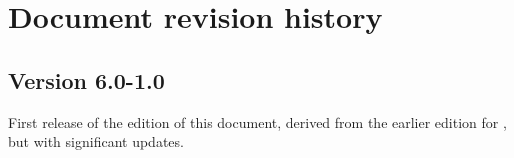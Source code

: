 \chapter*{Document revision history}
\renewcommand{\currentnav}{BLANK}

\section*{Version 6.0-1.0}
First release of the \thisv edition of this document, derived from the earlier edition for \prevv, but with significant updates.